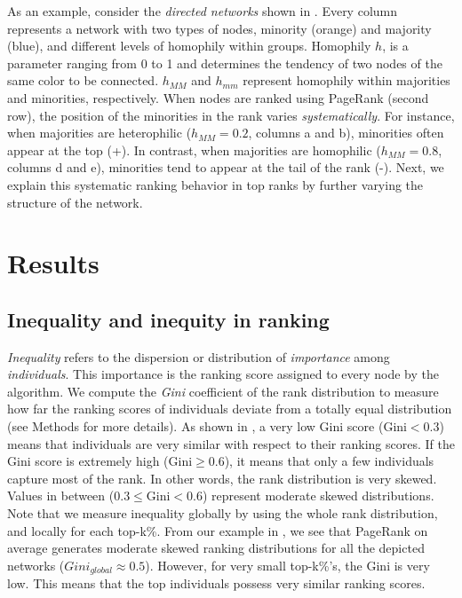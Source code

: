 \documentclass[fleqn,10pt]{wlscirep}
\begin{document}
As an example, consider the \textit{directed networks} shown in . Every column represents a network with two types of nodes, minority (orange) and majority (blue), and different levels of homophily within groups. Homophily $h$, is a parameter ranging from 0 to 1 and determines the tendency of two nodes of the same color to be connected. $h_{MM}$ and $h_{mm}$ represent homophily within majorities and minorities, respectively. When nodes are ranked using PageRank (second row), the position of the minorities in the rank varies \textit{systematically}. For instance, when majorities are heterophilic ($h_{MM}=0.2$, columns a and b), minorities often appear at the top (+). In contrast, when majorities are homophilic ($h_{MM}=0.8$, columns d and e), minorities tend to appear at the tail of the rank (-). Next, we explain this systematic ranking behavior in top ranks by further varying the structure of the network.













\section*{Results}


\subsection*{Inequality and inequity in ranking} %


\textit{Inequality} refers to the dispersion or distribution of \textit{importance} among \textit{individuals}. This importance is the ranking score assigned to every node by the algorithm.
We compute the \textit{Gini} coefficient of the rank distribution to measure how far the ranking scores of individuals deviate from a totally equal distribution (see Methods for more details).
As shown in , a very low Gini score ($\text{Gini}<0.3$) means that %
individuals %
are very similar with respect to their ranking scores. If the Gini score is extremely high ($\text{Gini}\geq 0.6$), it means that only a few individuals capture most of the rank. In other words, the rank distribution is very skewed. Values in between ($0.3\leq\text{Gini}<0.6$) represent moderate skewed distributions.
Note that we measure inequality globally by using the whole rank distribution, and locally for each top-k\%.
%
From our example in , we see that PageRank on average generates moderate skewed ranking distributions for all the depicted networks ($Gini_{global}\approx0.5$). However, for very small top-k\%'s, the Gini is very low. This means that the top individuals possess very similar ranking scores.
%
\end{document}
